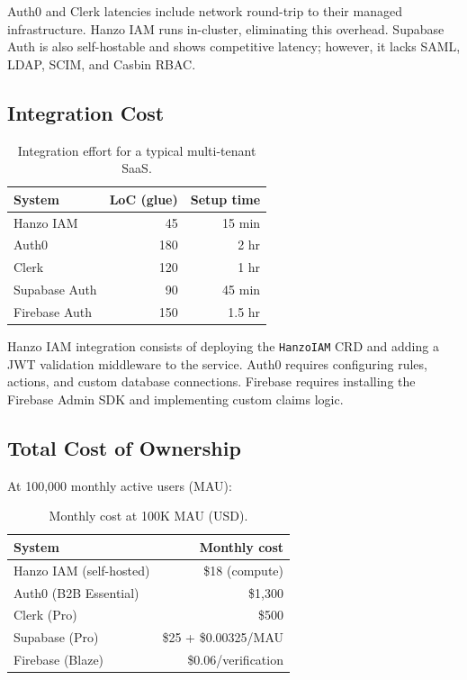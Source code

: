 \documentclass[11pt,twocolumn]{article}
\begin{document}
Auth0 and Clerk latencies include network round-trip to their managed infrastructure. Hanzo IAM runs in-cluster, eliminating this overhead. Supabase Auth is also self-hostable and shows competitive latency; however, it lacks SAML, LDAP, SCIM, and Casbin RBAC.

\subsection{Integration Cost}

\begin{table}[H]
\centering
\caption{Integration effort for a typical multi-tenant SaaS.}
\footnotesize
\begin{tabular}{@{}lrr@{}}
\toprule
System & LoC (glue) & Setup time \\
\midrule
Hanzo IAM & 45 & 15 min \\
Auth0 & 180 & 2 hr \\
Clerk & 120 & 1 hr \\
Supabase Auth & 90 & 45 min \\
Firebase Auth & 150 & 1.5 hr \\
\bottomrule
\end{tabular}
\end{table}

Hanzo IAM integration consists of deploying the \texttt{HanzoIAM} CRD and adding a JWT validation middleware to the service. Auth0 requires configuring rules, actions, and custom database connections. Firebase requires installing the Firebase Admin SDK and implementing custom claims logic.

\subsection{Total Cost of Ownership}

At 100,000 monthly active users (MAU):

\begin{table}[H]
\centering
\caption{Monthly cost at 100K MAU (USD).}
\footnotesize
\begin{tabular}{@{}lr@{}}
\toprule
System & Monthly cost \\
\midrule
Hanzo IAM (self-hosted) & \$18 (compute) \\
Auth0 (B2B Essential) & \$1,300 \\
Clerk (Pro) & \$500 \\
Supabase (Pro) & \$25 + \$0.00325/MAU \\
Firebase (Blaze) & \$0.06/verification \\
\bottomrule
\end{tabular}
\end{table}
\end{document}
